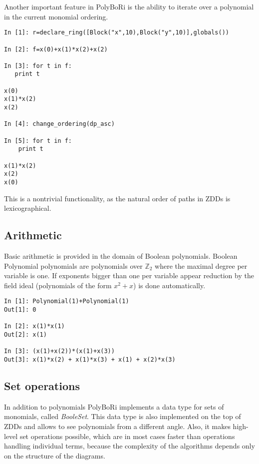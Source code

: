 \documentclass[]{article}
\newcommand{\PolyBoRi}{{\sc PolyBoRi}\xspace}
\newcommand{\functionname}[1]{\textit{#1}\xspace}
\newcounter{thm}
\newcommand{\Ztwo}{\mathbb{Z}_2}
\begin{document}
Another important feature in \PolyBoRi is the ability to iterate over a polynomial in the current monomial ordering.

\begin{verbatim}
In [1]: r=declare_ring([Block("x",10),Block("y",10)],globals())

In [2]: f=x(0)+x(1)*x(2)+x(2)

In [3]: for t in f:
   print t
   
x(0)
x(1)*x(2)
x(2)

In [4]: change_ordering(dp_asc)

In [5]: for t in f:
    print t

x(1)*x(2)
x(2)
x(0)
\end{verbatim}

This is a nontrivial functionality, as the natural order of paths in ZDDs is lexicographical.


\subsection{Arithmetic}
Basic arithmetic is provided in the domain of Boolean polynomials. Boolean Polynomial polynomials are polynomials over $\Ztwo$ where the maximal degree per variable is one.
If exponents bigger than one per variable appear reduction by the field ideal (polynomials of the form $x^2+x$) is done automatically.
\begin{verbatim}
In [1]: Polynomial(1)+Polynomial(1)
Out[1]: 0

In [2]: x(1)*x(1)
Out[2]: x(1)

In [3]: (x(1)+x(2))*(x(1)+x(3))
Out[3]: x(1)*x(2) + x(1)*x(3) + x(1) + x(2)*x(3)
\end{verbatim}

\subsection{Set operations}
In addition to polynomials  \PolyBoRi implements a data type for sets of monomials, called \functionname{BooleSet}.
This data type is also implemented on the top of ZDDs and allows to see
polynomials
from a different angle. Also, it makes high-level set operations possible, which are in most cases faster than operations handling individual terms, because the complexity of the algorithms depends only on the structure of the diagrams.
\end{document}
